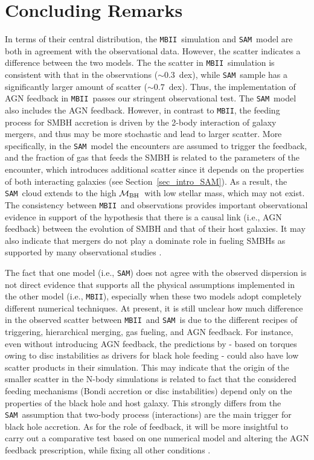 \documentclass[twocolumn,trackchanges]{aastex63}
\newcommand{\mbh}{$\mathcal M_{\rm BH}$}
\newcommand{\sam}{\texttt{SAM}}
\newcommand{\mbii}{\texttt{MBII}}
\begin{document}
\section{Concluding Remarks}
\label{sec:conclusion}
In terms of their central distribution, the \mbii\ simulation and \sam\ model are both in agreement with the observational data. However, the scatter indicates a difference between the two models. The  the scatter in \mbii\ simulation is consistent with that in the observations ($\sim0.3$~dex), while \sam\ sample has a significantly larger amount of scatter ($\sim0.7$~dex). Thus, the implementation of AGN feedback in \mbii\ passes our stringent observational test. The \sam\ model also includes the AGN feedback. However, in contrast to \mbii, the feeding process for SMBH accretion is driven by the 2-body interaction of galaxy mergers, and thus may be more stochastic and lead to larger scatter. More specifically, in the \sam\ model the encounters are assumed to trigger the feedback, and the fraction of gas that feeds the SMBH is related to the parameters of the encounter, which introduces additional scatter since it depends on the properties of both interacting galaxies (see Section~\ref{sec_intro_SAM}). As a result, the \sam\ cloud extends to the high \mbh\ with low stellar mass, which may not exist. The consistency between \mbii\ and observations provides important observational evidence in support of the hypothesis that there is a causal link (i.e., AGN feedback) between the evolution of SMBH and that of their host galaxies. It may also indicate that mergers do not play a dominate role in fueling SMBHs as supported by many observational studies \citep{Ellison2011, Silverman2011,Mechtley2016,Goulding2018}.

The fact that one model (i.e., \sam) does not agree with the observed dispersion is not direct evidence that supports all the physical assumptions implemented in the other model (i.e., \mbii), especially when these two models adopt completely different numerical techniques. At present, it is still unclear how much difference in the observed scatter between \mbii\ and \sam\ is due to the different recipes of triggering, hierarchical merging, gas fueling, and AGN feedback. For instance, even without introducing AGN feedback, the predictions by \citet{2017MNRAS.464.2840A} - based on torques owing to disc instabilities as 
 drivers for black hole feeding - could also have low scatter products in their simulation.
This may indicate that the origin of the smaller scatter in the N-body simulations is related to fact that the considered feeding mechanisms (Bondi accretion or disc instabilities) depend only on the properties of the black hole and host galaxy. 
This strongly differs from the \sam\ assumption that two-body process (interactions) are the main trigger for black hole accretion. 
As for the role of feedback, it will be more insightful to carry out a comparative test based on one numerical model and altering the AGN feedback prescription, while fixing all other conditions \citep[see][]{Hopkins2009}.
\end{document}
